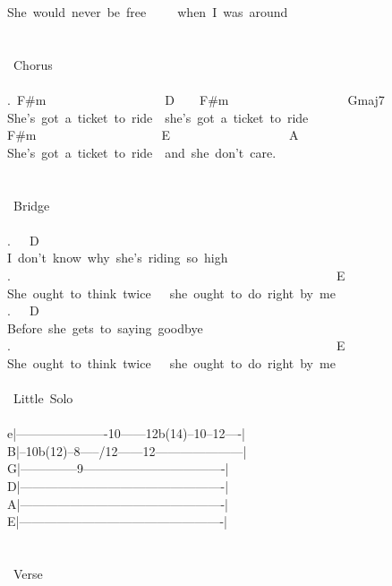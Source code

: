 {She\ would\ never\ be\ free\ \ \ \ \ when\ I\ was\ around\\
\\
\\
\lbrack\ Chorus\rbrack\\
\\
.\ F\#m\ \ \ \ \ \ \ \ \ \ \ \ \ \ \ \ \ \ \ D\ \ \ \ F\#m\ \ \ \ \ \ \ \ \ \ \ \ \ \ \ \ \ \ \ Gmaj7\\
She's\ got\ a\ ticket\ to\ ride\ \ she's\ got\ a\ ticket\ to\ ride\\
F\#m\ \ \ \ \ \ \ \ \ \ \ \ \ \ \ \ \ \ \ \ E\ \ \ \ \ \ \ \ \ \ \ \ \ \ \ \ \ \ \ A\\
She's\ got\ a\ ticket\ to\ ride\ \ and\ she\ don't\ care.\\
\\
\\
\lbrack\ Bridge\rbrack\\
\\
.\ \ \ D\\
I\ don't\ know\ why\ she's\ riding\ so\ high\\
.\ \ \ \ \ \ \ \ \ \ \ \ \ \ \ \ \ \ \ \ \ \ \ \ \ \ \ \ \ \ \ \ \ \ \ \ \ \ \ \ \ \ \ \ \ \ \ \ \ \ \ \ E\\
She\ ought\ to\ think\ twice\ \ \ she\ ought\ to\ do\ right\ by\ me\\
.\ \ \ D\\
Before\ she\ gets\ to\ saying\ goodbye\\
.\ \ \ \ \ \ \ \ \ \ \ \ \ \ \ \ \ \ \ \ \ \ \ \ \ \ \ \ \ \ \ \ \ \ \ \ \ \ \ \ \ \ \ \ \ \ \ \ \ \ \ \ E\\
She\ ought\ to\ think\ twice\ \ \ she\ ought\ to\ do\ right\ by\ me\\
\\
\newpage
\lbrack\ Little\ Solo\rbrack\\
\\
e|----------------------10------12b(14)--10--12----|\\
B|--10b(12)--8-----/12------12---------------------|\\
G|--------------9----------------------------------|\\
D|-------------------------------------------------|\\
A|-------------------------------------------------|\\
E|-------------------------------------------------|\\
\\
\\
\lbrack\ Verse\rbrack\\
}
